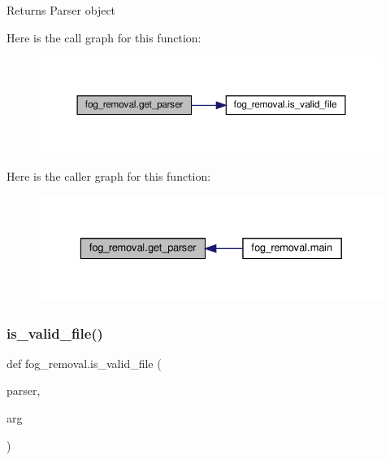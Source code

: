 \begin{DoxyReturn}{Returns}
Parser object 
\end{DoxyReturn}
Here is the call graph for this function\+:\nopagebreak
\begin{figure}[H]
\begin{center}
\leavevmode
\includegraphics[width=350pt]{namespacefog__removal_a89c98f8f9a6d048485938fc05675ce9e_cgraph}
\end{center}
\end{figure}
Here is the caller graph for this function\+:\nopagebreak
\begin{figure}[H]
\begin{center}
\leavevmode
\includegraphics[width=329pt]{namespacefog__removal_a89c98f8f9a6d048485938fc05675ce9e_icgraph}
\end{center}
\end{figure}
\mbox{\label{namespacefog__removal_a7b07384f6a6ff8498e14f3aa5f8e2252}} 
\subsubsection{\texorpdfstring{is\+\_\+valid\+\_\+file()}{is\_valid\_file()}}
{\footnotesize\ttfamily def fog\+\_\+removal.\+is\+\_\+valid\+\_\+file (\begin{DoxyParamCaption}\item[{}]{parser,  }\item[{}]{arg }\end{DoxyParamCaption})}



